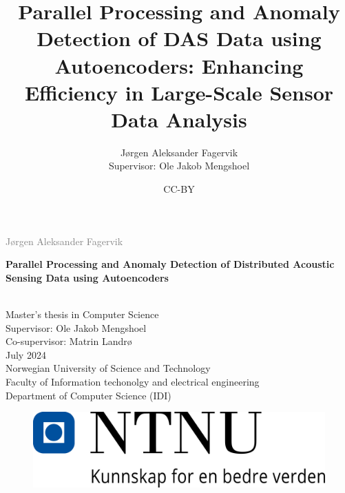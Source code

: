 \documentclass[british]{ntnuthesis}
\title{Parallel Processing and Anomaly Detection of DAS Data using Autoencoders: Enhancing Efficiency in Large-Scale Sensor Data Analysis}
\author{Jørgen Aleksander Fagervik \\
        Supervisor: Ole Jakob Mengshoel}
\date{CC-BY \ntnuthesisdate}
\begin{document}
\begin{titlepage}
\vspace*{1.5cm}

\noindent  \textcolor{gray}{\large Jørgen Aleksander Fagervik} \\
\vspace{1cm}

\noindent \textbf{\Large Parallel Processing and Anomaly Detection of Distributed Acoustic Sensing Data using Autoencoders } \\
\vspace{0.5cm}

 \\



\vspace{7cm}
\noindent Master's thesis in Computer Science \\
Supervisor: Ole Jakob Mengshoel \\
Co-supervisor: Matrin Landrø \\
July 2024 \\

\vspace{0.2cm}
\noindent Norwegian University of Science and Technology \\
Faculty of Information techonolgy and electrical engineering \\
Department of Computer Science (IDI) \\

\begin{figure}[h]
\includegraphics[scale=0.5]{figures/ntnu.png}
\end{figure}
\end{titlepage}
\restoregeometry
\myemptypage 





\tableofcontents
\listoffigures
\listoftables
\lstlistoflistings

\printglossary[type=\acronymtype] %
\printglossary                    %
\end{document}
